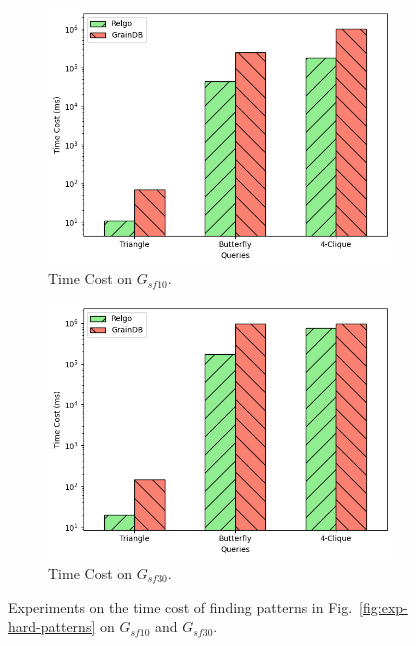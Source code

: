 \begin{figure}
    \centering
    \begin{subfigure}[b]{.45\linewidth}
        \centering
        \includegraphics[width=\linewidth]{./figures/exp/hard_sf10.png}
        \caption{Time Cost on $G_{sf10}$.}
        \label{fig:exp-hard-sf10}
    \end{subfigure}
    \begin{subfigure}[b]{0.45\linewidth}
        \centering
        \includegraphics[width=\linewidth]{./figures/exp/hard_sf30.png}
        \caption{Time Cost on $G_{sf30}$.}
        \label{fig:exp-hard-sf30}
    \end{subfigure}
    \caption{Experiments on the time cost of finding patterns in Fig.~\ref{fig:exp-hard-patterns} on $G_{sf10}$ and $G_{sf30}$.}
    \label{fig:exp-hard}
\end{figure}

